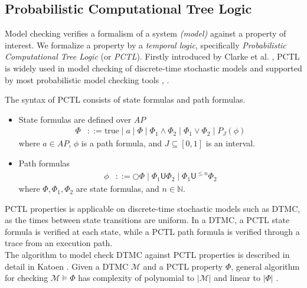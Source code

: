 \subsection{Probabilistic Computational Tree Logic}
Model checking verifies a formalism of a system \textit{(model)} against a property of interest. We
formalize a property by a \textit{temporal logic}, specifically \textit{Probabilistic Computational
    Tree Logic} (or \textit{PCTL}). Firstly introduced by Clarke et al. \cite{clarke1986automatic}, PCTL
is widely used in model checking of discrete-time stochastic models and supported by most
probabilistic model checking tools \cite{dehnert2017storm}, \cite{kwiatkowska2011prism}.
\begin{definition}[PCTL] The syntax of PCTL consists of state formulas and path formulas.
    \begin{itemize}
        \item State formulas are defined over $AP$
              \begin{align*}
                  \Phi & ::= \text{true} \;|\; a \;|\; \Phi \;|\; \Phi_1 \wedge \Phi_2 \;|\; \Phi_1 \vee \Phi_2 \;|\;  P_{J}(\phi)
              \end{align*}
              where $a\in AP$, $\phi$ is a path formula, and $J\subseteq[0,1]$ is an interval.
        \item Path formulas
              \begin{align*}
                  \phi & ::= \bigcirc \Phi \;|\; \Phi_1 \mathsf{U} \Phi_2 \;|\; \Phi_1 \mathsf{U}^{\leq n} \Phi_2
              \end{align*}
              where $\Phi,\Phi_1,\Phi_2$ are state formulas, and $n\in \mathbb{N}$.
    \end{itemize}
\end{definition}
PCTL properties is applicable on discrete-time stochastic models such as DTMC, as the times between
state transitions are uniform. In a DTMC, a PCTL state formula is verified at each state, while a
PCTL path formula is verified through a trace from an execution path.\\
The algorithm to model check DTMC against PCTL properties is described in detail in Katoen
\cite{baier2008principles}. Given a DTMC $\mathcal{M}$ and a PCTL property $\Phi$, general algorithm
for checking $\mathcal{M}\models\Phi$ has complexity of polynomial to $|\mathcal{M}|$ and linear to
$|\Phi|$ \cite{katoen2013model}.
